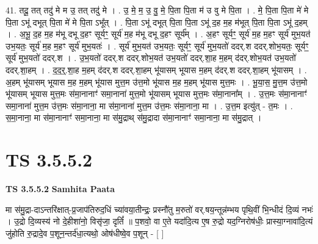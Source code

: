 \documentclass[17pt]{extarticle}
\begin{document}
41. तदू॒ तत् तदु॑ मे म उ॒ तत् तदु॑ मे । . उ॒ मे॒ म॒ उ॒ वु॒ मे॒ पि॒ता पि॒ता म॑ उ वु मे पि॒ता । . मे॒ पि॒ता पि॒ता मे॑ मे पि॒ता ऽभू॑ दभूत् पि॒ता मे॑ मे पि॒ता ऽभू᳚त् । . पि॒ता ऽभू॑ दभूत् पि॒ता पि॒ता ऽभू॑ द॒ह म॒ह म॑भूत् पि॒ता पि॒ता ऽभू॑ द॒हम् । . अ॒भू॒ द॒ह म॒ह म॑भू दभू द॒हꣳ सूर्यꣳ॒॒ सूर्य॑ म॒ह म॑भू दभू द॒हꣳ सूर्य᳚म् । . अ॒हꣳ सूर्यꣳ॒॒ सूर्य॑ म॒ह म॒हꣳ सूर्य॑ मुभ॒यत॑ उभ॒यतः॒ सूर्य॑ म॒ह म॒हꣳ सूर्य॑ मुभ॒यतः॑ । . सूर्य॑ मुभ॒यत॑ उभ॒यतः॒ सूर्यꣳ॒॒ सूर्य॑ मुभ॒यतो॑ ददर्.श ददर्.शोभ॒यतः॒ सूर्यꣳ॒॒ सूर्य॑ मुभ॒यतो॑ ददर्.श । . उ॒भ॒यतो॑ ददर्.श ददर्.शोभ॒यत॑ उभ॒यतो॑ ददर्.शा॒ह म॒हम् द॑दर्.शोभ॒यत॑ उभ॒यतो॑ ददर्.शा॒हम् । . द॒द॒र्॒.शा॒ह म॒हम् द॑दर्.श ददर्.शा॒हम् भू॑यासम् भूयास म॒हम् द॑दर्.श ददर्.शा॒हम् भू॑यासम् । . अ॒हम् भू॑यासम् भूयास म॒ह म॒हम् भू॑यास मुत्त॒म उ॑त्त॒मो भू॑यास म॒ह म॒हम् भू॑यास मुत्त॒मः । . भू॒या॒स॒ मु॒त्त॒म उ॑त्त॒मो भू॑यासम् भूयास मुत्त॒मः स॑मा॒नानाꣳ॑ समा॒नाना॑ मुत्त॒मो भू॑यासम् भूयास मुत्त॒मः स॑मा॒नाना᳚म् । . उ॒त्त॒मः स॑मा॒नानाꣳ॑ समा॒नाना॑ मुत्त॒म उ॑त्त॒मः स॑मा॒नाना॒ मा स॑मा॒नाना॑ मुत्त॒म उ॑त्त॒मः स॑मा॒नाना॒ मा । . उ॒त्त॒म इत्यु॑त् - त॒मः । . स॒मा॒नाना॒ मा स॑मा॒नानाꣳ॑ समा॒नाना॒ मा स॑मु॒द्राथ् स॑मु॒द्रादा स॑मा॒नानाꣳ॑ समा॒नाना॒ मा स॑मु॒द्रात् । \newline
\pagebreak
{}

\section{ TS 3.5.5.2 }

\textbf{TS 3.5.5.2 } \newline
\textbf{Samhita Paata} \newline

मा स॑मु॒द्रा-दाऽन्तरि॑क्षात्-प्र॒जाप॑तिरुद॒धिं च्या॑वया॒तीन्द्रः॒ प्रस्नौ॑तु म॒रुतो॑ वर्.षय॒न्तून्न॑म्भय पृथि॒वीं भि॒न्धीदं दि॒व्यं नभः॑ । उ॒द्रो दि॒व्यस्य॑ नो दे॒हीशा॑नो॒ विसृ॑जा॒ दृतिं᳚ ॥ प॒शवो॒ वा ए॒ते यदा॑दि॒त्य ए॒ष रु॒द्रो यद॒ग्निरोष॑धीः॒ प्रास्या॒ग्नावा॑दि॒त्यं जु॑होति रु॒द्रादे॒व प॒शून॒न्तर्द॑धा॒त्यथो॒ ओष॑धीष्वे॒व प॒शून् - [  ] \newline
\end{document}
